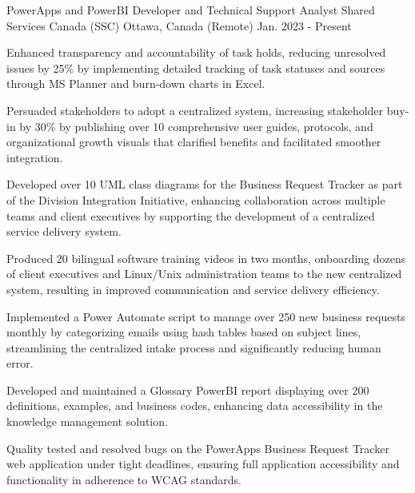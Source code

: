 

\begin{cventries}
\cventry
  {PowerApps and PowerBI Developer and Technical Support Analyst} %
  {Shared Services Canada (SSC)} %
  {Ottawa, Canada (Remote)} %
  {Jan. 2023 - Present} %
  {
    \begin{cvitems} %
      \item {Enhanced transparency and accountability of task holds, reducing unresolved issues by 25\% by implementing detailed tracking of task statuses and sources through MS Planner and burn-down charts in Excel.}
      \item {Persuaded stakeholders to adopt a centralized system, increasing stakeholder buy-in by 30\% by publishing over 10 comprehensive user guides, protocols, and organizational growth visuals that clarified benefits and facilitated smoother integration.}
      \item {Developed over 10 UML class diagrams for the Business Request Tracker as part of the Division Integration Initiative, enhancing collaboration across multiple teams and client executives by supporting the development of a centralized service delivery system.}
      \item {Produced 20 bilingual software training videos in two months, onboarding dozens of client executives and Linux/Unix administration teams to the new centralized system, resulting in improved communication and service delivery efficiency.}
      \item {Implemented a Power Automate script to manage over 250 new business requests monthly by categorizing emails using hash tables based on subject lines, streamlining the centralized intake process and significantly reducing human error.}
      \item {Developed and maintained a Glossary PowerBI report displaying over 200 definitions, examples, and business codes, enhancing data accessibility in the knowledge management solution.}
      \item {Quality tested and resolved bugs on the PowerApps Business Request Tracker web application under tight deadlines, ensuring full application accessibility and functionality in adherence to WCAG standards.}
    \end{cvitems}
  }


\end{cventries}
